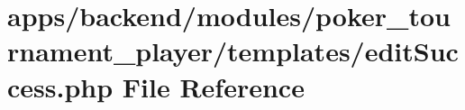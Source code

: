 \hypertarget{backend_2modules_2poker__tournament__player_2templates_2edit_success_8php}{\section{apps/backend/modules/poker\-\_\-tournament\-\_\-player/templates/edit\-Success.php File Reference}
\label{backend_2modules_2poker__tournament__player_2templates_2edit_success_8php}
}

